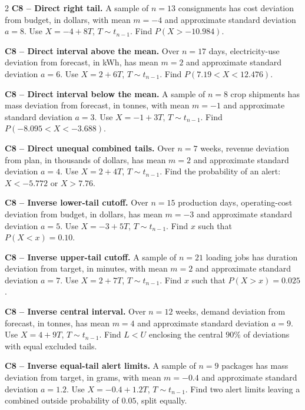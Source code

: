 \begin{multicols}{2}
\textbf{C8 -- Direct right tail.} A sample of $n=13$ consignments has cost deviation from budget, in dollars, with mean $m=-4$ and approximate standard deviation $a=8$. Use $X=-4+8T$, $T\sim t_{n-1}$.
Find $P(X>-10.984)$. 

\textbf{C8 -- Direct interval above the mean.} Over $n=17$ days, electricity-use deviation from forecast, in kWh, has mean $m=2$ and approximate standard deviation $a=6$. Use $X=2+6T$, $T\sim t_{n-1}$.
Find $P(7.19<X<12.476)$. 

\textbf{C8 -- Direct interval below the mean.} A sample of $n=8$ crop shipments has mass deviation from forecast, in tonnes, with mean $m=-1$ and approximate standard deviation $a=3$. Use $X=-1+3T$, $T\sim t_{n-1}$.
Find $P(-8.095<X<-3.688)$. 

\textbf{C8 -- Direct unequal combined tails.} Over $n=7$ weeks, revenue deviation from plan, in thousands of dollars, has mean $m=2$ and approximate standard deviation $a=4$. Use $X=2+4T$, $T\sim t_{n-1}$.
Find the probability of an alert: $X<-5.772$ or $X>7.76$. 

\textbf{C8 -- Inverse lower-tail cutoff.} Over $n=15$ production days, operating-cost deviation from budget, in dollars, has mean $m=-3$ and approximate standard deviation $a=5$. Use $X=-3+5T$, $T\sim t_{n-1}$.
Find $x$ such that $P(X<x)=0.10$. 

\textbf{C8 -- Inverse upper-tail cutoff.} A sample of $n=21$ loading jobs has duration deviation from target, in minutes, with mean $m=2$ and approximate standard deviation $a=7$. Use $X=2+7T$, $T\sim t_{n-1}$.
Find $x$ such that $P(X>x)=0.025$. 

\textbf{C8 -- Inverse central interval.} Over $n=12$ weeks, demand deviation from forecast, in tonnes, has mean $m=4$ and approximate standard deviation $a=9$. Use $X=4+9T$, $T\sim t_{n-1}$.
Find $L<U$ enclosing the central $90\%$ of deviations with equal excluded tails. 

\textbf{C8 -- Inverse equal-tail alert limits.} A sample of $n=9$ packages has mass deviation from target, in grams, with mean $m=-0.4$ and approximate standard deviation $a=1.2$. Use $X=-0.4+1.2T$, $T\sim t_{n-1}$.
Find two alert limits leaving a combined outside probability of $0.05$, split equally. 


\end{multicols}
